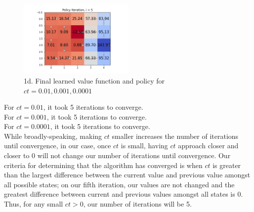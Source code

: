 \documentclass[submit]{harvardml}
\begin{document}
\begin{itemize}
     \begin{figure}[h!]
        \includegraphics[width=0.5\textwidth]{HW6/Policy_5.png}
        \caption{1d. Final learned value function and policy for $ct = 0.01, 0.001, 0.0001$}
    \end{figure}
    For $ct = 0.01$, it took 5 iterations to converge. \\
    For $ct = 0.001$, it took 5 iterations to converge. \\
    For $ct = 0.0001$, it took 5 iterations to converge. \\
   

    While broadly-speaking, making $ct$ smaller increases the number of iterations until convergence, in our case, once $ct$ is small, having $ct$ approach closer and closer to $0$ will not change our number of iterations until convergence. Our criteria for determining that the algorithm has converged is when $ct$ is greater than the largest difference between the current value and previous value amongst all possible states; on our fifth iteration, our values are not changed and the greatest difference between current and previous values amongst all states is $0$. Thus, for any small $ct > 0$, our number of iterations will be 5. 


\end{itemize}
\end{document}
